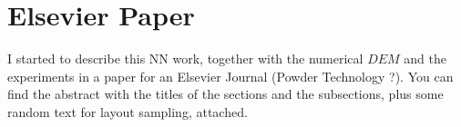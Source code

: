 
\section{Elsevier Paper}
\label{sec:elsevierpaper}

I started to describe this NN work, together with the numerical $DEM$ and the experiments in a paper for an Elsevier Journal (Powder Technology ?).
You can find the abstract with the titles of the sections and the subsections, plus some random text for layout sampling, attached.\\